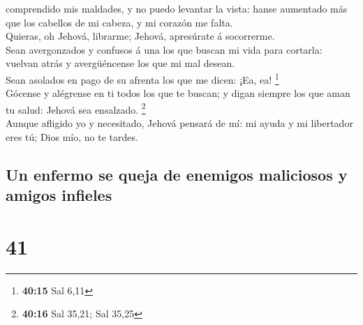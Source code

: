 comprendido mis maldades, y no puedo levantar la vista: hanse aumentado
más que los cabellos de mi cabeza, y mi corazón me falta.\\
 Quieras, oh Jehová, librarme; Jehová, apresúrate á
socorrerme.\\
 Sean avergonzados y confusos á una los que buscan mi vida
para cortarla: vuelvan atrás y avergüéncense los que mi mal desean.\\
 Sean asolados en pago de su afrenta los que me dicen: ¡Ea,
ea! \footnote{\textbf{40:15} Sal 6,11}\\
 Gócense y alégrense en ti todos los que te buscan; y digan
siempre los que aman tu salud: Jehová sea ensalzado. \footnote{\textbf{40:16}
  Sal 35,21; Sal 35,25}\\
 Aunque afligido yo y necesitado, Jehová pensará de mí: mi
ayuda y mi libertador eres tú; Dios mío, no te tardes.

\hypertarget{un-enfermo-se-queja-de-enemigos-maliciosos-y-amigos-infieles}{%
\subsection{Un enfermo se queja de enemigos maliciosos y amigos
infieles}\label{un-enfermo-se-queja-de-enemigos-maliciosos-y-amigos-infieles}}

\hypertarget{section-40}{%
\section{41}\label{section-40}}

